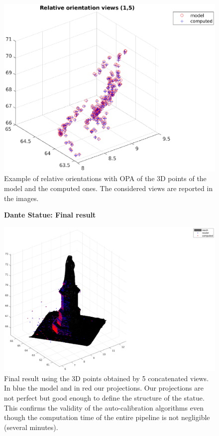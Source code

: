 \documentclass[11pt]{article}
\begin{document}
\begin{figure}[H]
    \includegraphics[scale=0.45]{images/relative_4.eps}
    \caption{Example of relative orientations with OPA of the 3D points of the model and the computed ones. The considered views are reported in the images.}
    \label{fig:relative}
\end{figure}

\begin{figure}[H]
    \centering
    \textbf{Dante Statue: Final result}\par\medskip
    \hspace*{-7cm}
    \includegraphics[scale=0.65]{images/statue.eps}
    \caption{Final result using the 3D points obtained by 5 concatenated views. In blue the model and in red our projections. Our projections are not perfect but good enough to define the structure of the statue. This confirms the validity of the auto-calibration algorithms even though the computation time of the entire pipeline is not negligible (several minutes).}
    \label{fig:statue}
\end{figure}
\end{document}
